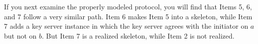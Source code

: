 If you next examine the properly modeled protocol, you will find that
Items 5, 6, and 7 follow a very similar path.  Item 6 makes Item 5 into
a skeleton, while Item 7 adds a key server instance in which the key
server agrees with the initiator on $a$ but not on $b$.  But Item 7 is
a realized skeleton, while Item 2 is not realized.


